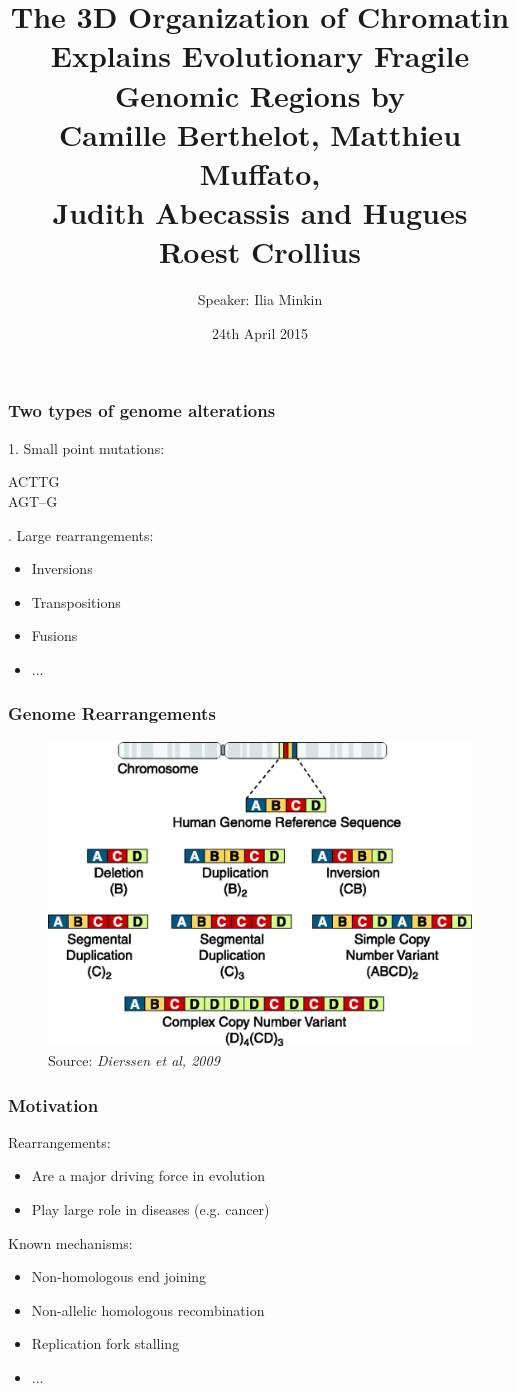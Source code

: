 \documentclass[svgnames,14pt]{beamer}
\title{The 3D Organization of Chromatin Explains Evolutionary Fragile Genomic Regions by \\ \vspace{12pt} \normalsize{Camille Berthelot, Matthieu Muffato, \\ Judith Abecassis and Hugues Roest Crollius} }
\author{Speaker: Ilia Minkin}
\institute{}
\begin{document}
\date{24th April 2015}
\maketitle

\begin{frame}
\frametitle{Two types of genome alterations}

1. Small point mutations:

{\vspace{12pt} \Large \color{Blue}
ACTTG\\
A{\color{Red}G}T--\hspace{2.7pt}G
\vspace{12pt}}

. Large rearrangements:
\begin{itemize}
\item Inversions
\item Transpositions
\item Fusions
\item ...
\end{itemize}
\end{frame}

\begin{frame}
\frametitle{Genome Rearrangements}
\begin{figure}
	\centering
	\includegraphics[scale = 0.20]{BasicRearr.jpg}
\caption{Source: \textit{Dierssen et al, 2009}}
\end{figure}
\end{frame}

\begin{frame}
\frametitle{Motivation}
Rearrangements:
\begin{itemize}
\item Are a major driving force in evolution
\item Play large role in diseases (e.g. cancer)
\end{itemize}
Known mechanisms:
\begin{itemize}
\item Non-homologous end joining
\item Non-allelic homologous recombination
\item Replication fork stalling
\item ...
\end{itemize}
\end{frame}
\end{document}

